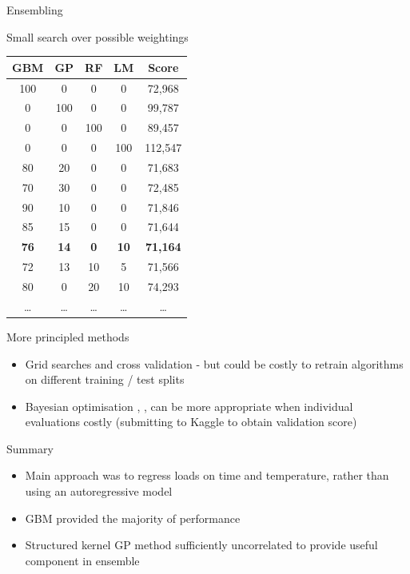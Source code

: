 \begin{frame}{Ensembling}
  \begin{block}{Small search over possible weightings}
    \begin{center}
      \scriptsize
      \begin{tabular}{cccc|c}
        GBM & GP & RF & LM & Score \\
        \hline
        100 & 0 & 0 & 0 & 72,968 \\
        0 & 100 & 0 & 0 & 99,787 \\
        0 & 0 & 100 & 0 & 89,457 \\
        0 & 0 & 0 & 100 & 112,547 \\
        80 & 20 & 0 & 0 & 71,683 \\
        70 & 30 & 0 & 0 & 72,485 \\
        90 & 10 & 0 & 0 & 71,846 \\
        85 & 15 & 0 & 0 & 71,644 \\
        \bf{76} & \bf{14} & \bf{0} & \bf{10} & \bf{71,164} \\
        72 & 13 & 10 & 5 & 71,566 \\
        80 & 0 & 20 & 10 & 74,293 \\
        \ldots & \ldots & \ldots & \ldots & \ldots
      \end{tabular}
      \vspace{-1\baselineskip}
    \end{center}
      \vspace{-1\baselineskip}
  \end{block}
  \begin{block}{More principled methods}
    \begin{itemize}
      \item Grid searches and cross validation - but could be costly to retrain algorithms on different training / test splits
      \item Bayesian optimisation \cite{Osborne2009}, \cite{snoek2012practical}, \cite{HennigSchuler2012} can be more appropriate when individual evaluations costly (\eg submitting to Kaggle to obtain validation score)
    \end{itemize}
  \end{block}
\end{frame}

\begin{frame}{Summary}
  \begin{itemize}
    \item Main approach was to regress loads on time and temperature, rather than using an autoregressive model
    \vspace{2\baselineskip}
    \item GBM provided the majority of performance
    \vspace{2\baselineskip}
    \item Structured kernel GP method sufficiently uncorrelated to provide useful component in ensemble
  \end{itemize}
\end{frame}

